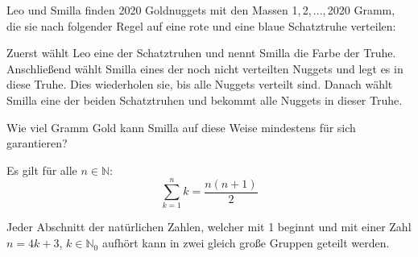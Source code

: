 \documentclass[10pt, a4paper]{amsart}
\newenvironment{proof thm}[1]{
\begin{proof}[\proofname~(#1)]}{\end{proof}}
\begin{document}
\thispagestyle{fancy}
\begin{aufgabe}
  Leo und Smilla finden 2020 Goldnuggets mit den Massen 1, 2, ..., 2020 Gramm,
  die sie nach folgender Regel auf eine rote und eine blaue Schatztruhe
  verteilen:
  
  Zuerst wählt Leo eine der Schatztruhen und nennt Smilla die Farbe der Truhe.
  Anschließend wählt Smilla eines der noch nicht verteilten Nuggets und legt es
  in diese Truhe. Dies wiederholen sie, bis alle Nuggets verteilt sind. Danach
  wählt Smilla eine der beiden Schatztruhen und bekommt alle Nuggets in dieser
  Truhe.

  Wie viel Gramm Gold kann Smilla auf diese Weise mindestens für sich
  garantieren?
\end{aufgabe}
\begin{lemma}\label{sec1:Zahlensumme}
  Es gilt für alle $n\in\mathbb{N}$:
  \[ \sum^{n}_{k=1}k=\dfrac{n(n+1)}{2}\]
\end{lemma}
\begin{lemma}
  \label{sec1:zahlengruppen}
  Jeder Abschnitt der natürlichen Zahlen, welcher mit 1 beginnt und mit einer
  Zahl $n=4k+3$, $k∈ℕ_0$ aufhört kann in zwei gleich große Gruppen geteilt
  werden.
\end{lemma}
\end{document}
